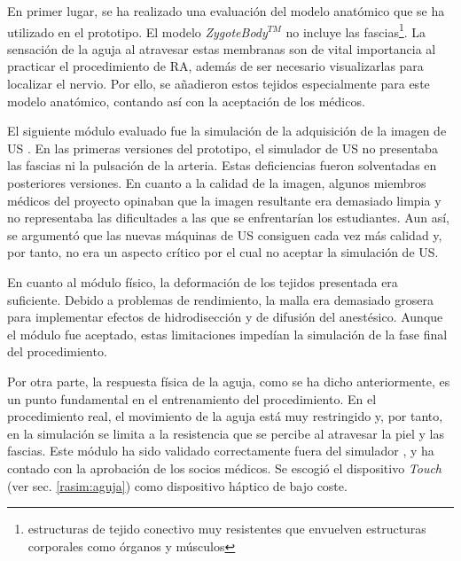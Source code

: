 En primer lugar, se ha realizado una evaluación del modelo anatómico que se ha utilizado en el prototipo. El modelo \emph{ZygoteBody}$^{TM}$ no incluye las fascias\footnote{estructuras de tejido conectivo muy resistentes que envuelven estructuras corporales como órganos y músculos}. La sensación de la aguja al atravesar estas membranas son de vital importancia al practicar el procedimiento de \ac{RA}, además de ser necesario visualizarlas para localizar el nervio. Por ello, se añadieron estos tejidos especialmente para este modelo anatómico, contando así con la aceptación de los médicos.

El siguiente módulo evaluado fue la simulación de la adquisición de la imagen de \ac{US} \cite{Law2015}. En las primeras versiones del prototipo, el simulador de \ac{US} no presentaba las fascias ni la pulsación de la arteria. Estas deficiencias fueron solventadas en posteriores versiones. En cuanto a la calidad de la imagen, algunos miembros médicos  del proyecto opinaban que la imagen resultante era demasiado limpia y no representaba las dificultades a las que se enfrentarían los estudiantes. Aun así, se argumentó que las nuevas máquinas de \ac{US} consiguen cada vez más calidad y, por tanto, no era un aspecto crítico por el cual no aceptar la simulación de \ac{US}.

En cuanto al módulo físico, la deformación de los tejidos presentada era suficiente. Debido a problemas de rendimiento, la malla era demasiado grosera para implementar efectos de hidrodisección y de difusión del anestésico. Aunque el módulo fue aceptado, estas limitaciones impedían la simulación de la fase final del procedimiento.

Por otra parte, la respuesta física de la aguja, como se ha dicho anteriormente, es un punto fundamental en el entrenamiento del procedimiento. En el procedimiento real, el movimiento de la aguja está muy restringido y, por tanto, en la simulación se limita a la resistencia que se percibe al atravesar la piel y las fascias. Este módulo ha sido validado correctamente fuera del simulador \cite{needleinsertion}, y ha contado con la aprobación de los socios médicos. Se escogió el dispositivo \emph{Touch} (ver sec. \ref{rasim:aguja}) como dispositivo háptico de bajo coste. %

